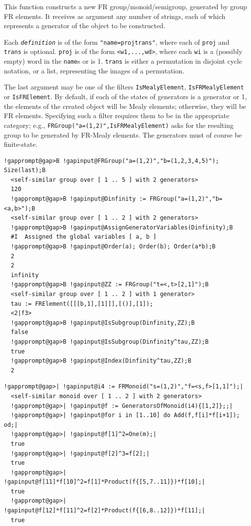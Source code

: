 \documentclass[a4paper,11pt]{report}
\begin{document}
{{{ This function constructs a new FR group/monoid/semigroup, generated by group
FR elements. It receives as argument any number of strings, each of which
represents a generator of the object to be constructed. 

 Each \mbox{\texttt{\mdseries\slshape definition}} is of the form \texttt{"name=projtrans"}, where each of \texttt{proj} and \texttt{trans} is optional. \texttt{proj} is of the form \texttt{{\textless}w1,...,wd{\textgreater}}, where each \texttt{wi} is a (possibly empty) word in the \texttt{name}s or is 1. \texttt{trans} is either a permutation in disjoint cycle notation, or a list, representing
the images of a permutation. 

 The last argument may be one of the filters \texttt{IsMealyElement}, \texttt{IsFRMealyElement} or \texttt{IsFRElement}. By default, if each of the states of generators is a generator or 1, the
elements of the created object will be Mealy elements; otherwise, they will be
FR elements. Specifying such a filter requires them to be in the appropriate
category; e.g., \texttt{FRGroup("a=(1,2)",IsFRMealyElement)} asks for the resulting group to be generated by FR-Mealy elements. The
generators must of course be finite-state. 
\begin{Verbatim}[commandchars=!@B,fontsize=\small,frame=single,label=Example]
  !gapprompt@gap>B !gapinput@FRGroup("a=(1,2)","b=(1,2,3,4,5)"); Size(last);B
  <self-similar group over [ 1 .. 5 ] with 2 generators>
  120
  !gapprompt@gap>B !gapinput@Dinfinity := FRGroup("a=(1,2)","b=<a,b>");B
  <self-similar group over [ 1 .. 2 ] with 2 generators>
  !gapprompt@gap>B !gapinput@AssignGeneratorVariables(Dinfinity);B
  #I  Assigned the global variables [ a, b ]
  !gapprompt@gap>B !gapinput@Order(a); Order(b); Order(a*b);B
  2
  2
  infinity
  !gapprompt@gap>B !gapinput@ZZ := FRGroup("t=<,t>[2,1]");B
  <self-similar group over [ 1 .. 2 ] with 1 generator>
  tau := FRElement([[[b,1],[1]]],[()],[1]);
  <2|f3>
  !gapprompt@gap>B !gapinput@IsSubgroup(Dinfinity,ZZ);B
  false
  !gapprompt@gap>B !gapinput@IsSubgroup(Dinfinity^tau,ZZ);B
  true
  !gapprompt@gap>B !gapinput@Index(Dinfinity^tau,ZZ);B
  2
\end{Verbatim}
 
\begin{Verbatim}[commandchars=!@|,fontsize=\small,frame=single,label=Example]
  !gapprompt@gap>| !gapinput@i4 := FRMonoid("s=(1,2)","f=<s,f>[1,1]");|
  <self-similar monoid over [ 1 .. 2 ] with 2 generators>
  !gapprompt@gap>| !gapinput@f := GeneratorsOfMonoid(i4){[1,2]};;|
  !gapprompt@gap>| !gapinput@for i in [1..10] do Add(f,f[i]*f[i+1]); od;|
  !gapprompt@gap>| !gapinput@f[1]^2=One(m);|
  true
  !gapprompt@gap>| !gapinput@f[2]^3=f[2];|
  true
  !gapprompt@gap>| !gapinput@f[11]*f[10]^2=f[1]*Product(f{[5,7..11]})*f[10];|
  true
  !gapprompt@gap>| !gapinput@f[12]*f[11]^2=f[2]*Product(f{[6,8..12]})*f[11];|
  true
\end{Verbatim}
 
}}}
\end{document}

